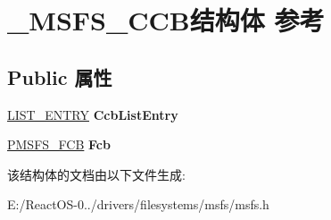 \hypertarget{struct___m_s_f_s___c_c_b}{}\section{\+\_\+\+M\+S\+F\+S\+\_\+\+C\+C\+B结构体 参考}
\label{struct___m_s_f_s___c_c_b}
\subsection*{Public 属性}
\begin{DoxyCompactItemize}
\item 
\mbox{\label{struct___m_s_f_s___c_c_b_a02f1fb82f06ece0a5a7cfd4d2e18f183}} 
\hyperlink{struct___l_i_s_t___e_n_t_r_y}{L\+I\+S\+T\+\_\+\+E\+N\+T\+RY} {\bfseries Ccb\+List\+Entry}
\item 
\mbox{\label{struct___m_s_f_s___c_c_b_aa2d72085fd18867f3a04f07a1c9f4a40}} 
\hyperlink{struct___m_s_f_s___f_c_b}{P\+M\+S\+F\+S\+\_\+\+F\+CB} {\bfseries Fcb}
\end{DoxyCompactItemize}


该结构体的文档由以下文件生成\+:\begin{DoxyCompactItemize}
\item 
E\+:/\+React\+O\+S-\/0../drivers/filesystems/msfs/msfs.\+h\end{DoxyCompactItemize}
